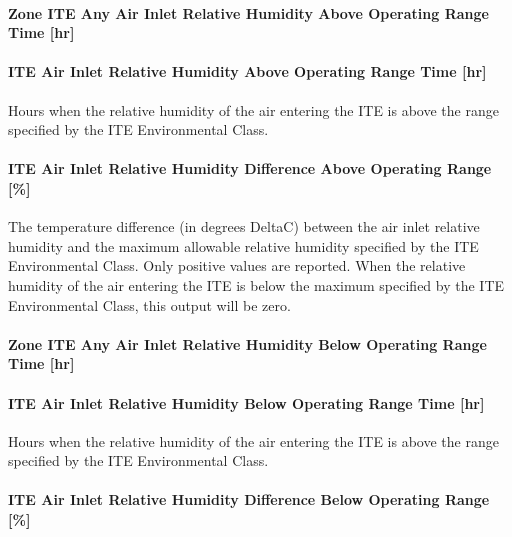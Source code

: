 \paragraph{Zone ITE Any Air Inlet Relative Humidity Above Operating Range Time {[}hr{]}}\label{zone-ite-any-air-inlet-relative-humidity-above-operating-range-time-hr}

\paragraph{ITE Air Inlet Relative Humidity Above Operating Range Time {[}hr{]}}\label{ite-air-inlet-relative-humidity-above-operating-range-time-hr}

Hours when the relative humidity of the air entering the ITE is above the range specified by the ITE Environmental Class.

\paragraph{ITE Air Inlet Relative Humidity Difference Above Operating Range {[}\%{]}}\label{ite-air-inlet-relative-humidity-difference-above-operating-range}

The temperature difference (in degrees DeltaC) between the air inlet relative humidity and the maximum allowable relative humidity specified by the ITE Environmental Class. Only positive values are reported. When the relative humidity of the air entering the ITE is below the maximum specified by the ITE Environmental Class, this output will be zero.

\paragraph{Zone ITE Any Air Inlet Relative Humidity Below Operating Range Time {[}hr{]}}\label{zone-ite-any-air-inlet-relative-humidity-below-operating-range-time-hr}

\paragraph{ITE Air Inlet Relative Humidity Below Operating Range Time {[}hr{]}}\label{ite-air-inlet-relative-humidity-below-operating-range-time-hr}

Hours when the relative humidity of the air entering the ITE is above the range specified by the ITE Environmental Class.

\paragraph{ITE Air Inlet Relative Humidity Difference Below Operating Range {[}\%{]}}\label{ite-air-inlet-relative-humidity-difference-below-operating-range}

